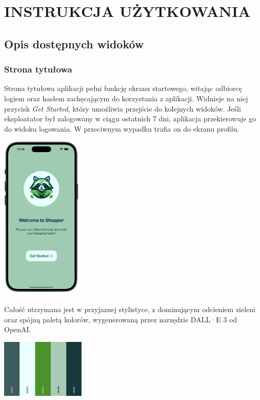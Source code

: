 \chapter{INSTRUKCJA UŻYTKOWANIA}
\label{chapter:instrukcja_uzytkowania}

\section{Opis dostępnych widoków}

\subsection{Strona tytułowa}

Strona tytułowa aplikacji pełni funkcję ekranu startowego, witając odbiorcę logiem oraz hasłem zachęcającym do korzystania z aplikacji. Widnieje na niej przycisk \textit{Get Started}, który umożliwia przejście do kolejnych widoków. Jeśli eksploatator był zalogowany w ciągu ostatnich 7 dni, aplikacja przekierowuje go do widoku logowania. W przeciwnym wypadku trafia on do ekranu profilu. 

\begin{center} \includegraphics[width=0.3\textwidth]{images/front/home_page.png} \end{center}

Całość utrzymana jest w przyjaznej stylistyce, z dominującym odcieniem zieleni oraz spójną paletą kolorów, wygenerowaną przez narzędzie DALL·E 3 od OpenAI.

\begin{center} \includegraphics[width=0.3\textwidth]{images/front/theme.png} \end{center}

